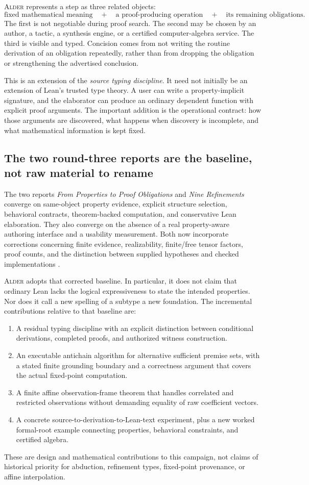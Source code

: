 \documentclass[11pt,a4paper]{article}
\newcommand{\Alder}{\textsc{Alder}}
\theoremstyle{plain}
\theoremstyle{definition}
\theoremstyle{remark}
\begin{document}
\Alder{} represents a step as three related objects:
\[
 \text{fixed mathematical meaning}\quad+\quad
 \text{a proof-producing operation}\quad+\quad
 \text{its remaining obligations}.
\]
The first is not negotiable during proof search. The second may be chosen by an author, a tactic, a synthesis engine, or a certified computer-algebra service. The third is visible and typed. Concision comes from not writing the routine derivation of an obligation repeatedly, rather than from dropping the obligation or strengthening the advertised conclusion.

This is an extension of the \emph{source typing discipline}. It need not initially be an extension of Lean's trusted type theory. A user can write a property-implicit signature, and the elaborator can produce an ordinary dependent function with explicit proof arguments. The important addition is the operational contract: how those arguments are discovered, what happens when discovery is incomplete, and what mathematical information is kept fixed.

\subsection{The two round-three reports are the baseline, not raw material to rename}
The two reports \emph{From Properties to Proof Obligations} and \emph{Nine Refinements} converge on same-object property evidence, explicit structure selection, behavioral contracts, theorem-backed computation, and conservative Lean elaboration. They also converge on the absence of a real property-aware authoring interface and a usability measurement. Both now incorporate corrections concerning finite evidence, realizability, finite/free tensor factors, proof counts, and the distinction between supplied hypotheses and checked implementations \cite{r3a,r3b}.

\Alder{} adopts that corrected baseline. In particular, it does not claim that ordinary Lean lacks the logical expressiveness to state the intended properties. Nor does it call a new spelling of a subtype a new foundation. The incremental contributions relative to that baseline are:
\begin{enumerate}
\item A residual typing discipline with an explicit distinction between conditional derivations, completed proofs, and authorized witness construction.
\item An executable antichain algorithm for alternative sufficient premise sets, with a stated finite grounding boundary and a correctness argument that covers the actual fixed-point computation.
\item A finite affine observation-frame theorem that handles correlated and restricted observations without demanding equality of raw coefficient vectors.
\item A concrete source-to-derivation-to-Lean-text experiment, plus a new worked formal-root example connecting properties, behavioral constraints, and certified algebra.
\end{enumerate}
These are design and mathematical contributions to this campaign, not claims of historical priority for abduction, refinement types, fixed-point provenance, or affine interpolation.
\end{document}
